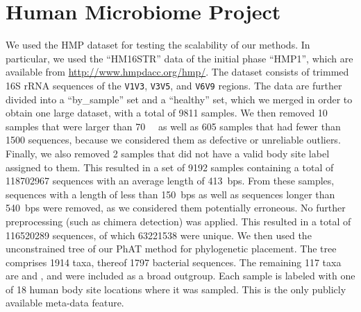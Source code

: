 \section{Human Microbiome Project}
\label{supp:sec:DetailsEmpiricalDatasets:sub:HMP}

We used the \acf{HMP} dataset \cite{Huttenhower2012,Methe2012} for testing the scalability of our methods.
In particular, we used the ``HM16STR'' data of the initial phase ``HMP1'',
which are available from \url{http://www.hmpdacc.org/hmp/}.
The dataset consists of trimmed 16S rRNA sequences of the \texttt{V1V3}, \texttt{V3V5}, and \texttt{V6V9} regions.
The data are further divided into a ``by\_sample'' set and a ``healthy'' set,
which we merged in order to obtain one large dataset, with a total of \num{9 811} samples.
We then removed \num{10} samples that were larger than \SI{70}{\mega\byte}
as well as \num{605} samples that had fewer than \num{1 500} sequences,
because we considered them as defective or unreliable outliers.
Finally, we also removed \num{2} samples that did not have a valid body site label assigned to them.
This resulted in a set of \num{9192} samples
containing a total of \num{118 702 967} sequences with an average length of \SI{413}{bps}.
From these samples, sequences with a length of less than \SI{150}{bps}
as well as sequences longer than \SI{540}{bps} were removed,
as we considered them potentially erroneous.
No further preprocessing (such as chimera detection) was applied.
This resulted in a total of \num{116 520 289} sequences, of which \num{63 221 538} were unique.
We then used the unconstrained  tree of our \ac{PhAT} method \cite{Czech2018} for phylogenetic placement.
The tree comprises \num{1 914} taxa, thereof \num{1 797} bacterial sequences.
The remaining \num{117} taxa are  and ,
and were included as a broad outgroup.
Each sample is labeled with one of \num{18} human body site locations where it was sampled.
This is the only publicly available meta-data feature.


